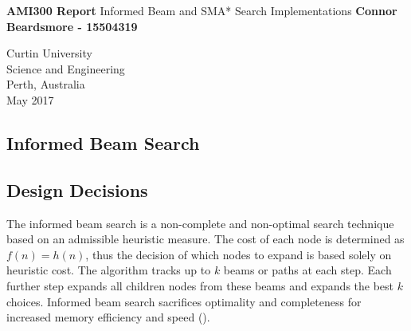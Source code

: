 \documentclass[]{article}
\begin{document}


	

\begin{titlepage}
	\begin{center}
		\vspace*{1cm}
		\LARGE\textbf{AMI300 Report} \vspace{0.5cm}
		\break
	    Informed Beam and SMA* Search Implementations
		\vspace{1cm}
		\break
		\Large\textbf{Connor Beardsmore - 15504319} 
		\vspace{15cm}

		\normalsize
		Curtin University \\
		Science and Engineering \\
		Perth, Australia \\
	    May 2017
	    
	\end{center}
\end{titlepage}


\vspace*{-0.8cm}
\begin{center}
	\section*{Informed Beam Search}
\end{center}

\vspace*{0.8cm}
\subsection*{Design Decisions}

The informed beam search is a non-complete and non-optimal search technique based on an admissible heuristic measure. The cost of each node is determined as $f(n)=h(n)$, thus the decision of which nodes to expand is based solely on heuristic cost. The algorithm tracks up to $k$ beams or paths at each step. Each further step expands all children nodes from these beams and expands the best $k$ choices. Informed beam search sacrifices optimality and completeness for increased memory efficiency and speed (\cite{winston}).\\
\end{document}
